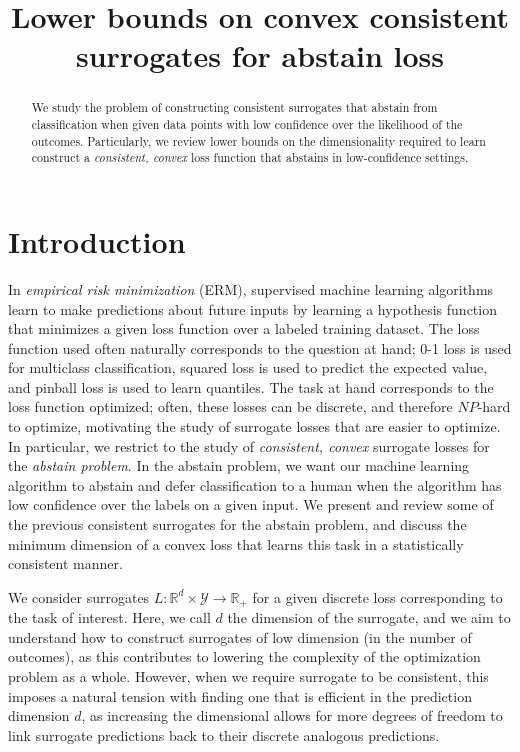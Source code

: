 \documentclass[anon,12pt]{colt2021} %
\title{Lower bounds on convex consistent surrogates for abstain loss}
\newcommand{\reals}{\mathbb{R}}
\newcommand{\Y}{\mathcal{Y}}
\begin{document}
\maketitle

\begin{abstract}
We study the problem of constructing consistent surrogates that abstain from classification when given data points with low confidence over the likelihood of the outcomes.
Particularly, we review lower bounds on the dimensionality required to learn construct a \emph{consistent, convex} loss function that abstains in low-confidence settings.
\end{abstract}

\section{Introduction}
In \emph{empirical risk minimization} (ERM), supervised machine learning algorithms learn to make predictions about future inputs by learning a hypothesis function that minimizes a given loss function over a labeled training dataset.
The loss function used often naturally corresponds to the question at hand; 0-1 loss is used for multiclass classification, squared loss is used to predict the expected value, and pinball loss is used to learn quantiles.
The task at hand corresponds to the loss function optimized; often, these losses can be discrete, and therefore $NP$-hard to optimize, motivating the study of surrogate losses that are easier to optimize.
In particular, we restrict to the study of \emph{consistent, convex} surrogate losses for the \emph{abstain problem}.
In the abstain problem, we want our machine learning algorithm to abstain and defer classification to a human when the algorithm has low confidence over the labels on a given input.
We present and review some of the previous consistent surrogates for the abstain problem, and discuss the minimum dimension of a convex loss that learns this task in a statistically consistent manner.

We consider surrogates $L:\reals^d \times \Y \to \reals_+$ for a given discrete loss corresponding to the task of interest.
Here, we call $d$ the dimension of the surrogate, and we aim to understand how to construct surrogates of low dimension (in the number of outcomes), as this contributes to lowering the complexity of the optimization problem as a whole.
However, when we require surrogate to be consistent, this imposes a natural tension with finding one that is efficient in the prediction dimension $d$, as increasing the dimensional allows for more degrees of freedom to link surrogate predictions back to their discrete analogous predictions.
\end{document}
